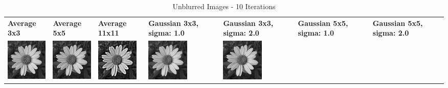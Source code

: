 \begin{table}[h!]
    \centering
    \captionsetup{justification=centering}
    \caption*{Unblurred Images - 10 Iterations}
    \begin{tabular}{>{\centering\arraybackslash} m{2cm} >{\centering\arraybackslash} m{2cm} >{\centering\arraybackslash} m{2cm} >{\centering\arraybackslash} m{2cm} >{\centering\arraybackslash} m{2cm} >{\centering\arraybackslash} m{2cm} >{\centering\arraybackslash} m{2cm}}
        \textbf{Average 3x3}                                                                             & \textbf{Average 5x5} & \textbf{Average 11x11} & \textbf{Gaussian 3x3, sigma: 1.0} & \textbf{Gaussian 3x3, sigma: 2.0} & \textbf{Gaussian 5x5, sigma: 1.0} & \textbf{Gaussian 5x5, sigma: 2.0} \\
        \includegraphics[width=2cm]{images/processed/flower/average_3x3/unblurred_10-iter.png}           &
        \includegraphics[width=2cm]{images/processed/flower/average_5x5/unblurred_10-iter.png}           &
        \includegraphics[width=2cm]{images/processed/flower/average_11x11/unblurred_10-iter.png}         &
        \includegraphics[width=2cm]{images/processed/flower/gaussian_3x3_sigma1.0/unblurred_10-iter.png} &
        \includegraphics[width=2cm]{images/processed/flower/gaussian_3x3_sigma2.0/unblurred_10-iter.png} &

\end{tabular}
\end{table}

